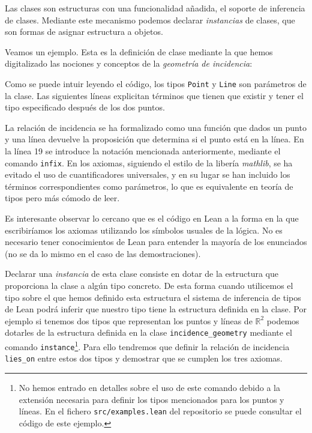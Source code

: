 Las clases son estructuras con una funcionalidad añadida, el soporte de
inferencia de clases. Mediante este mecanismo podemos declarar
\textit{instancias} de clases, que son formas de asignar estructura a objetos.

Veamos un ejemplo. Esta es la definición de clase mediante la que hemos
digitalizado las nociones y conceptos de la \textit{geometría de incidencia}:


Como se puede intuir leyendo el código, los tipos \lstinline{Point} y
\lstinline{Line} son parámetros de la clase. Las siguientes líneas explicitan
términos que tienen que existir y tener el tipo especificado después de los dos
puntos.

La relación de incidencia se ha formalizado como una función que dados un punto
y una línea devuelve la proposición que determina si el punto está en la línea.
En la línea 19 se introduce la notación mencionada anteriormente, mediante el
comando \lstinline{infix}. En los axiomas, siguiendo el estilo de la libería
\textit{mathlib}, se ha evitado el uso de cuantificadores universales, y en su
lugar se han incluido los términos correspondientes como parámetros, lo que es
equivalente en teoría de tipos pero más cómodo de leer.

Es interesante observar lo cercano que es el código en Lean a la forma
en la que escribiríamos los axiomas utilizando los símbolos usuales de la
lógica. No es necesario tener conocimientos de Lean para entender la
mayoría de los enunciados (no se da lo mismo en el caso de las demostraciones).

Declarar una \textit{instancia} de esta clase consiste en dotar de la estructura
que proporciona la clase a algún tipo concreto. De esta forma cuando utilicemos
el tipo sobre el que hemos definido esta estructura el sistema de inferencia de
tipos de Lean podrá inferir que nuestro tipo tiene la estructura definida en la
clase. Por ejemplo si tenemos dos tipos que representan los puntos y líneas de
$\mathbb{R}^2$ podemos dotarles de la estructura definida en la clase
\lstinline{incidence_geometry} mediante el comando
\lstinline{instance}\footnote{No hemos entrado en detalles sobre el uso de este
comando debido a la extensión necesaria para definir los tipos mencionados para
los puntos y líneas. En el fichero \texttt{src/examples.lean} del repositorio se
puede consultar el código de este ejemplo.}. Para ello tendremos que definir la
relación de incidencia \lstinline{lies_on} entre estos dos tipos y demostrar que
se cumplen los tres axiomas.

